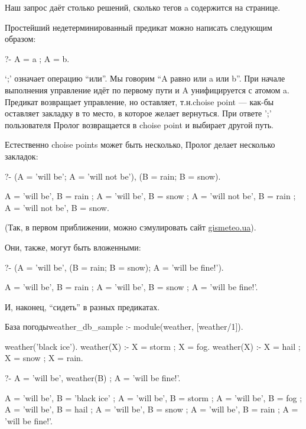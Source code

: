 \documentclass[a4paper]{book}
\def\tn{т.\thinspace н.}
\begin{document}
Наш запрос даёт столько решений, сколько тегов a содержится на
странице. 

Простейший недетерминированный предикат можно написать следующим
образом:

\begin{example}{}{}
?- A = a ; A = b.
\end{example}

`;' означает операцию ``или''. Мы говорим ``A равно или a или
b''. При начале выполнения управление идёт по первому пути и A
унифицируется с атомом a. Предикат возвращает управление, но
оставляет, \tn choise point --- как-бы оставляет закладку в то
место, в которое желает вернуться. При ответе ';' пользователя
Пролог возвращается в choise point и выбирает другой путь.

Естественно choise points может быть несколько, Пролог делает
несколько закладок:

\begin{example}{}{}
?- (A = 'will be'; A = 'will not be'), (B = rain; B = snow).

A = 'will be',
B = rain 
;
A = 'will be',
B = snow 
;
A = 'will not be',
B = rain 
;
A = 'will not be',
B = snow.
\end{example}

(Так, в первом приближении, можно сэмулировать сайт
\url{gismeteo.ua}).

Они, также, могут быть вложенными:

\begin{example}{}{}
?- (A = 'will be', (B = rain; B = snow); A = 'will be fine!').

A = 'will be',
B = rain 
;
A = 'will be',
B = snow 
;
A = 'will be fine!'.
\end{example}

И, наконец, ``сидеть'' в разных предикатах.

\begin{example}{База погоды}{weather_db_sample}
:- module(weather, [weather/1]).

weather('black ice').
weather(X) :- X = storm ; X = fog.
weather(X) :- X = hail ; X = snow ; X = rain.
\end{example}

\begin{example}{}{}
?- A = 'will be', weather(B) ; A = 'will be fine!'.

A = 'will be',
B = 'black ice' ;
A = 'will be',
B = storm ;
A = 'will be',
B = fog ;
A = 'will be',
B = hail ;
A = 'will be',
B = snow ;
A = 'will be',
B = rain ;
A = 'will be fine!'.
\end{example}
\end{document}
